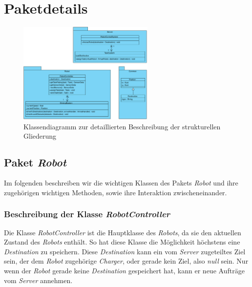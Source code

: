 \section{Paketdetails}
\begin{figure}[H]
\centering
\includegraphics[width=0.6\textwidth]{../images/Iteration0_Entwurf_7_Paketdetails}
\caption{Klassendiagramm zur detaillierten Beschreibung der strukturellen Gliederung}
\label{Paketdetails}
\end{figure}

\subsection{Paket \textit{Robot}}
	Im folgenden beschreiben wir die wichtigen Klassen des Pakets \textit{Robot} 
	und ihre zugehörigen wichtigen Methoden, sowie ihre Interaktion zwischeneinander. 


	\subsubsection{Beschreibung der Klasse \textit{RobotController}}
		
		Die Klasse \textit{RobotController} ist die Hauptklasse des \textit{Robots}, 
		da sie den aktuellen Zustand des \textit{Robots} enthält.
		So hat diese Klasse die Möglichkeit höchstens eine \textit{Destination} zu speichern. 
		Diese \textit{Destination} kann ein vom \textit{Server} zugeteiltes Ziel sein, 
		der dem \textit{Robot} zugehörige \textit{Charger}, oder gerade kein Ziel, 
		also \textit{null} sein. Nur wenn der \textit{Robot} gerade keine \textit{Destination} 
		gespeichert hat, kann er neue Aufträge vom \textit{Server} annehmen.

